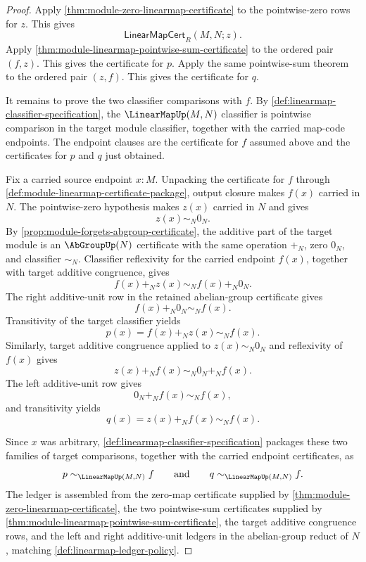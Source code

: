 \begin{proof}
Apply \autoref{thm:module-zero-linearmap-certificate} to the pointwise-zero rows for $z$. This gives
$$
\mathsf{LinearMapCert}_R(M,N;z).
$$
Apply \autoref{thm:module-linearmap-pointwise-sum-certificate} to the ordered pair $(f,z)$. This gives the certificate for $p$. Apply the same pointwise-sum theorem to the ordered pair $(z,f)$. This gives the certificate for $q$.

It remains to prove the two classifier comparisons with $f$. By \autoref{def:linearmap-classifier-specification}, the $\LinearMapUp(M,N)$ classifier is pointwise comparison in the target module classifier, together with the carried map-code endpoints. The endpoint clauses are the certificate for $f$ assumed above and the certificates for $p$ and $q$ just obtained.

Fix a carried source endpoint $x:M$. Unpacking the certificate for $f$ through \autoref{def:module-linearmap-certificate-package}, output closure makes $f(x)$ carried in $N$. The pointwise-zero hypothesis makes $z(x)$ carried in $N$ and gives
$$
z(x)\sim_N0_N.
$$
By \autoref{prop:module-forgets-abgroup-certificate}, the additive part of the target module is an $\AbGroupUp(N)$ certificate with the same operation $+_N$, zero $0_N$, and classifier $\sim_N$. Classifier reflexivity for the carried endpoint $f(x)$, together with target additive congruence, gives
$$
f(x)+_N z(x)\sim_N f(x)+_N0_N.
$$
The right additive-unit row in the retained abelian-group certificate gives
$$
f(x)+_N0_N\sim_N f(x).
$$
Transitivity of the target classifier yields
$$
p(x)=f(x)+_N z(x)\sim_N f(x).
$$
Similarly, target additive congruence applied to $z(x)\sim_N0_N$ and reflexivity of $f(x)$ gives
$$
z(x)+_N f(x)\sim_N0_N+_N f(x).
$$
The left additive-unit row gives
$$
0_N+_N f(x)\sim_N f(x),
$$
and transitivity yields
$$
q(x)=z(x)+_N f(x)\sim_N f(x).
$$

Since $x$ was arbitrary, \autoref{def:linearmap-classifier-specification} packages these two families of target comparisons, together with the carried endpoint certificates, as
$$
p\sim_{\LinearMapUp(M,N)}f
\qquad\text{and}\qquad
q\sim_{\LinearMapUp(M,N)}f.
$$
The ledger is assembled from the zero-map certificate supplied by \autoref{thm:module-zero-linearmap-certificate}, the two pointwise-sum certificates supplied by \autoref{thm:module-linearmap-pointwise-sum-certificate}, the target additive congruence rows, and the left and right additive-unit ledgers in the abelian-group reduct of $N$, matching \autoref{def:linearmap-ledger-policy}.
\end{proof}


